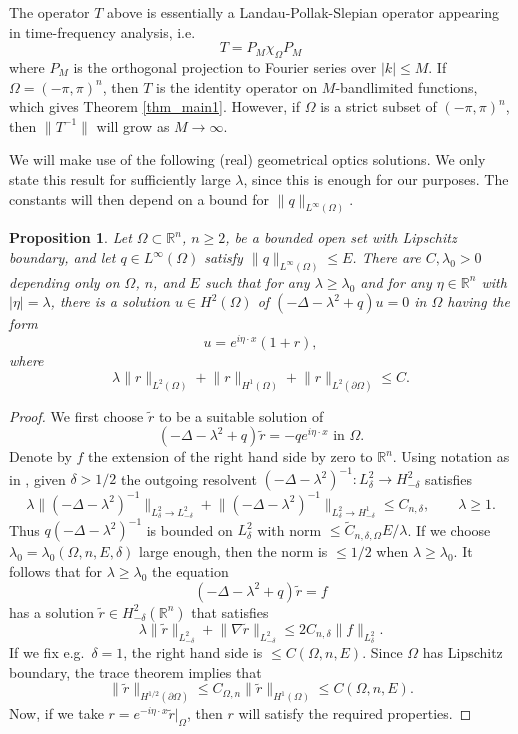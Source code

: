 \documentclass[a4paper, 11pt, twoside, notitlepage]{amsart}
\newtheorem{proposition}[theorem]{Proposition}
\theoremstyle{definition}
\theoremstyle{remark}
\newcommand{\R}{{\mathbb R}}
\newcommand{\norm}[1]{\lVert #1 \rVert}
\begin{document}
The operator $T$ above is essentially a Landau-Pollak-Slepian operator appearing in time-frequency analysis, i.e. 
\[
T = P_M \chi_{\Omega} P_M
\]
where $P_M$ is the orthogonal projection to Fourier series over $|k| \leq M$. If $\Omega = (-\pi,\pi)^n$, then $T$ is the identity operator on $M$-bandlimited functions, which gives Theorem \ref{thm_main1}. However, if $\Omega$ is a strict subset of $(-\pi,\pi)^n$, then $\norm{T^{-1}}$ will grow as $M \to \infty$.

We will make use of the following (real) geometrical optics solutions. We only state this result for sufficiently large $\lambda$, since this is enough for our purposes. The constants will then depend on a bound for $\norm{q}_{L^{\infty}(\Omega)}$.

\begin{proposition} \label{prop_go_solutions}
Let $\Omega\subset \R^n$, $n \geq 2$, be a bounded open set with Lipschitz boundary, and let $q \in L^{\infty}(\Omega)$ satisfy $\norm{q}_{L^{\infty}(\Omega)} \leq E$. There are $C, \lambda_0 > 0$ depending only on $\Omega$, $n$, and $E$ such that for any $\lambda \geq \lambda_0$ and for any $\eta \in \R^n$ with $|\eta| = \lambda$, there is a solution $u \in H^2(\Omega)$ of $(-\Delta-\lambda^2+q)u = 0$ in $\Omega$ having the form 
\[
u = e^{i\eta \cdot x}(1+r),
\]
where 
\[
\lambda \norm{r}_{L^2(\Omega)} + \norm{r}_{H^1(\Omega)} + \norm{r}_{L^2(\partial \Omega)} \leq C.
\]
\end{proposition}
\begin{proof}
We first choose $\tilde{r}$ to be a suitable solution of  
\[
(-\Delta-\lambda^2+q) \tilde{r} = -q e^{i \eta \cdot x} \text{ in $\Omega$}.
\]
Denote by $f$ the extension of the right hand side by zero to $\R^n$. Using notation as in \cite[Chapter 7]{feldman_calderproblem_nodate}, given $\delta > 1/2$ the outgoing resolvent $(-\Delta-\lambda^2)^{-1}: L^2_{\delta} \to H^2_{-\delta}$ satisfies 
\[
\lambda \norm{(-\Delta-\lambda^2)^{-1}}_{L^2_{\delta} \to L^2_{-\delta}} + \norm{(-\Delta-\lambda^2)^{-1}}_{L^2_{\delta} \to H^1_{-\delta}}\leq C_{n,\delta}, \qquad \lambda \geq 1.
\]
Thus $q(-\Delta-\lambda^2)^{-1}$ is bounded on $L^2_{\delta}$ with norm $\leq \tilde{C}_{n,\delta, \Omega} E/\lambda$. If we choose $\lambda_0 = \lambda_0(\Omega, n, E, \delta)$ large enough, then  the norm is $\leq 1/2$ when $\lambda \geq \lambda_0$. It follows that for $\lambda \geq \lambda_0$ the equation 
\[
(-\Delta-\lambda^2+q) \tilde{r} = f
\]
has a solution $\tilde{r} \in H^2_{-\delta}(\R^n)$ that satisfies 
\[
\lambda \norm{\tilde{r}}_{L^2_{-\delta}} + \norm{\nabla \tilde{r}}_{L^2_{-\delta}} \leq 2 C_{n,\delta} \norm{f}_{L^2_{\delta}}.
\]
If we fix e.g.\ $\delta=1$, the right hand side is $\leq C(\Omega,n,E)$.
Since $\Omega$ has Lipschitz boundary, the trace theorem implies that 
\[
\norm{\tilde{r}}_{H^{1/2}(\partial \Omega)} \leq C_{\Omega,n} \norm{\tilde{r}}_{H^1(\Omega)} \leq C(\Omega,n,E).
\]
Now, if we take $r = e^{-i \eta \cdot x} \tilde{r}|_{\Omega}$, then $r$ will satisfy the required properties.
\end{proof}
\end{document}
